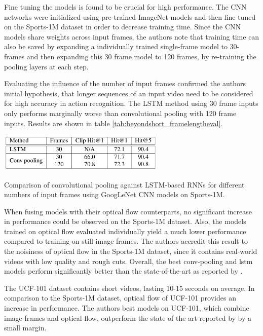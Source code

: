Fine tuning the models is found to be crucial for high performance.
The CNN networks were initialized using pre-trained ImageNet models and then fine-tuned on the Sports-1M dataset in order to decrease training time.
Since the CNN models share weights across input frames, the authors note that training time can also be saved by expanding a individually trained single-frame model to 30-frames and then expanding this 30 frame model to 120 frames, by re-training the pooling layers at each step.


Evaluating the influence of the number of input frames confirmed the authors initial hypothesis, that longer sequences of an input video need to be considered for high accuracy in action recognition.
The LSTM method using 30 frame inputs only performs marginally worse than convolutional pooling with 120 frame inputs.
Results are shown in table \ref{tab:beyondshort_framelengtheval}.

\begin{table}[H]
    \centering
    \includegraphics[width=0.6\textwidth]{img_deep/beyondshort_framelengtheval}
    \caption{Comparison of convolutional pooling against LSTM-based RNNs for different numbers of input frames using GoogLeNet CNN models on Sports-1M. \cite{ng_beyond_2015}}
    \label{tab:beyondshort_framelengtheval}
\end{table}

When fusing models with their optical flow counterparts, no significant increase in performance could be observed on the Sports-1M dataset.
Also, the models trained on optical flow evaluated individually yield a much lower performance compared to training on still image frames.
The authors accredit this result to the noisiness of optical flow in the Sports-1M dataset, since it contains real-world videos with low quality and rough cuts.
Overall, the best conv-pooling and lstm models perform significantly better than the state-of-the-art as reported by \textcite{karpathy_large-scale_2014}.

The UCF-101 dataset contains short videos, lasting 10-15 seconds on average.
In comparison to the Sports-1M dataset, optical flow of UCF-101 provides an increase in performance.
The authors best models on UCF-101, which combine image frames and optical-flow, outperform the state of the art reported by \textcite{simonyan_two-stream_2014} by a small margin.


